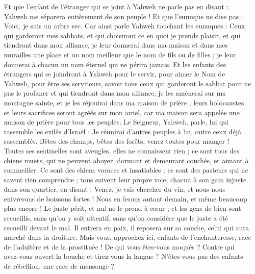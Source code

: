 \begin{multicols}{2}
Et que l'enfant de l'étranger qui se joint à Yahweh ne parle pas en disant : Yahweh me séparera entièrement de son peuple ! Et que l'eunuque ne dise pas : Voici, je suis un arbre sec.
Car ainsi parle Yahweh touchant les eunuques : Ceux qui garderont mes sabbats, et qui choisiront ce en quoi je prends plaisir, et qui tiendront dans mon alliance,
je leur donnerai dans ma maison et dans mes murailles une place et un nom meilleur que le nom de fils ou de filles ; je leur donnerai à chacun un nom éternel qui ne périra jamais.
Et les enfants des étrangers qui se joindront à Yahweh pour le servir, pour aimer le Nom de Yahweh, pour être ses serviteurs, savoir tous ceux qui garderont le sabbat pour ne pas le profaner et qui tiendront dans mon alliance,
je les amènerai sur ma montagne sainte, et je les réjouirai dans ma maison de prière ; leurs holocaustes et leurs sacrifices seront agréés sur mon autel, car ma maison sera appelée une maison de prière pour tous les peuples.
Le Seigneur, Yahweh, parle, lui qui rassemble les exilés d'Israël : Je réunirai d'autres peuples à lui, outre ceux déjà rassemblés.
Bêtes des champs, bêtes des forêts, venez toutes pour manger !
Toutes ses sentinelles sont aveugles, elles ne connaissent rien ; ce sont tous des chiens muets, qui ne peuvent aboyer, dormant et demeurant couchés, et aimant à sommeiller.
Ce sont des chiens voraces et insatiables ; ce sont des pasteurs qui ne savent rien comprendre ; tous suivent leur propre voie, chacun à son gain injuste dans son quartier, en disant :
Venez, je vais chercher du vin, et nous nous enivrerons de boissons fortes ! Nous en ferons autant demain, et même beaucoup plus encore !
\VerseOne{}Le juste périt, et nul ne le prend à cœur ; et les gens de bien sont recueillis, sans qu'on y soit attentif, sans qu'on considère que le juste a été recueilli devant le mal.
Il entrera en paix, il reposera sur sa couche, celui qui aura marché dans la droiture.
Mais vous, approchez ici, enfants de l'enchanteresse, race de l'adultère et de la prostituée !
De qui vous êtes-vous moqués ? Contre qui avez-vous ouvert la bouche et tirez-vous la langue ? N'êtes-vous pas des enfants de rébellion, une race de mensonge ?

\end{multicols}
